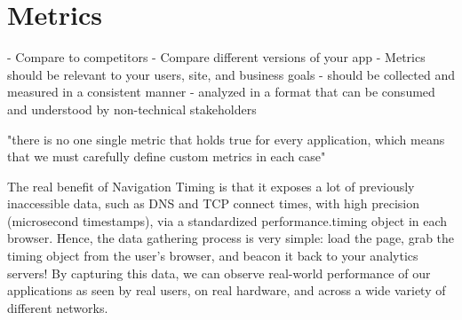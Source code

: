 




\section{Metrics}
















- Compare to competitors
- Compare different versions of your app
- Metrics should be relevant to your users, site, and business goals
- should be collected and measured in a consistent manner
- analyzed in a format that can be consumed and understood by non-technical stakeholders




"there is no one single metric that holds true for every application, which means that we must carefully define custom metrics in each case"

The real benefit of Navigation Timing is that it exposes a lot of previously inaccessible data, such as DNS and TCP connect times, with high precision (microsecond timestamps), via a standardized performance.timing object in each browser. Hence, the data gathering process is very simple: load the page, grab the timing object from the user’s browser, and beacon it back to your analytics servers! By capturing this data, we can observe real-world performance of our applications as seen by real users, on real hardware, and across a wide variety of different networks.

